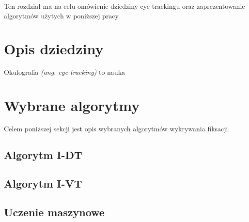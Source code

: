Ten rozdział ma na celu omówienie dziedziny eye-trackingu oraz zaprezentowanie algorytmów użytych w poniższej pracy.
\section{Opis dziedziny}
Okulografia \textit{(ang. eye-tracking)} to nauka 
\section{Wybrane algorytmy}
Celem poniższej sekcji jest opis wybranych algorytmów wykrywania fiksacji.
\subsection{Algorytm I-DT}
\subsection{Algorytm I-VT}
\subsection{Uczenie maszynowe}